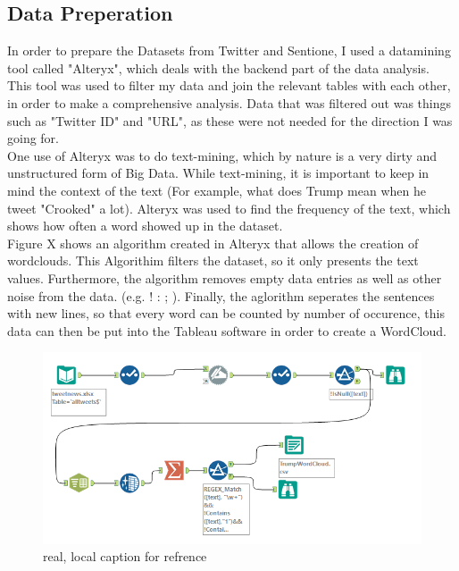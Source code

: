 \documentclass[11pt]{article}
\begin{document}
\subsection{Data Preperation}
In order to prepare the Datasets from Twitter and Sentione, I used a datamining tool called "Alteryx", which deals with the backend part of the data analysis. This tool was used to filter my data and join the relevant tables with each other, in order to make a comprehensive analysis. Data that was filtered out was things such as "Twitter ID" and "URL", as these were not needed for the direction I was going for. \\


One use of Alteryx was to do text-mining, which by nature is a very dirty and unstructured form of Big Data. While text-mining, it is important to keep in mind the context of the text (For example, what does Trump mean when he tweet "Crooked" a lot). Alteryx was used to find the frequency of the text, which shows how often a word showed up in the dataset.  \\

Figure X shows an algorithm created in Alteryx that allows the creation of wordclouds. This Algorithim filters the dataset, so it only presents the text values. Furthermore, the algorithm removes empty data entries as well as other noise from the data. (e.g. ! : ; ). Finally, the aglorithm seperates the sentences with new lines, so that every word can be counted by number of occurence, this data can then be put into the Tableau software in order to create a WordCloud.



\begin{figure}[H] %
	\centering %
\includegraphics [scale= .65]  {TrumpWordCloudAlteryxFinal.PNG}    %
	\caption[Optional caption] {real, local caption for refrence}
	\label{fig:wordcloudBliz}

\end{figure}
\end{document}
